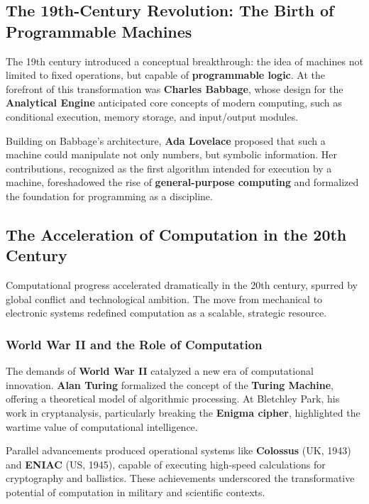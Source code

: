 \subsection{The 19th-Century Revolution: The Birth of Programmable Machines}

The 19th century introduced a conceptual breakthrough: the idea of machines not limited to fixed operations, but capable of \textbf{programmable logic}. At the forefront of this transformation was \textbf{Charles Babbage}, whose design for the \textbf{Analytical Engine} anticipated core concepts of modern computing, such as conditional execution, memory storage, and input/output modules.

Building on Babbage’s architecture, \textbf{Ada Lovelace} proposed that such a machine could manipulate not only numbers, but symbolic information. Her contributions, recognized as the first algorithm intended for execution by a machine, foreshadowed the rise of \textbf{general-purpose computing} and formalized the foundation for programming as a discipline.

\subsection{The Acceleration of Computation in the 20th Century}

Computational progress accelerated dramatically in the 20th century, spurred by global conflict and technological ambition. The move from mechanical to electronic systems redefined computation as a scalable, strategic resource.

\subsubsection{World War II and the Role of Computation}

The demands of \textbf{World War II} catalyzed a new era of computational innovation. \textbf{Alan Turing} formalized the concept of the \textbf{Turing Machine}, offering a theoretical model of algorithmic processing. At Bletchley Park, his work in cryptanalysis, particularly breaking the \textbf{Enigma cipher}, highlighted the wartime value of computational intelligence.

Parallel advancements produced operational systems like \textbf{Colossus} (UK, 1943) and \textbf{ENIAC} (US, 1945), capable of executing high-speed calculations for cryptography and ballistics. These achievements underscored the transformative potential of computation in military and scientific contexts.


